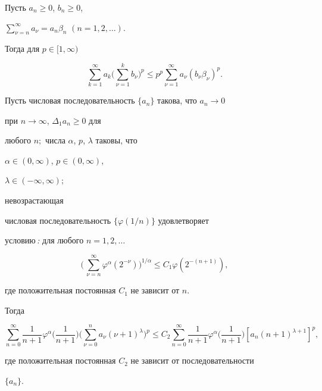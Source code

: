 \begin{lem} Пусть $a_n\ge 0$, $b_n\ge 0$,


$\sum\limits^\infty_{\nu=n}a_\nu=a_n\beta_n$ $(n=1,2,\dotsc)$.


Тогда для $p\in[1,\infty)$


$$


\sum^\infty_{k=1}a_k\biggl(\sum^k_{\nu=1}b_\nu\biggr)^p\le


p^p\sum^\infty_{\nu=1}a_\nu(b_\nu\beta_\nu)^p.


$$


\end{lem}





\begin{lem}


Пусть числовая последовательность $\{a_n\}$ такова, что $a_n\to 0$


при $n\to\infty$, $\Delta_1a_n\ge 0$ для


любого $n;$ числа $\alpha$, $p$, $\lambda$ таковы, что


$\alpha\in(0,\infty)$, $p\in(0,\infty)$,


$\lambda\in(-\infty,\infty);$


невозрастающая


числовая последовательность $\{\varphi(1/n)\}$ удовлетворяет


условию\,{\em :} для любого $n=1,2,\dotsc$


\begin{equation}


\biggl(\,\sum^\infty_{\nu=n}\varphi^\alpha(2^{-\nu})


\biggr)^{1/\alpha}\le C_1\varphi(2^{-(n+1)}),


\end{equation}


где положительная постоянная $C_1$ не зависит от $n$.





Тогда


$$


\sum^\infty_{n=0}\frac{1}{n+1}\varphi^\alpha


\biggl(\frac{1}{n+1} \biggr)\biggl(\sum^n_{\nu=0}a_\nu(\nu+1)^\lambda


\biggr)^p\le C_2\sum^\infty_{n=0}\frac{1}{n+1}


\varphi^\alpha\biggl(\frac{1}{n+1} \biggr)


[a_n(n+1)^{\lambda+1}]^p,


$$


где положительная постоянная $C_2$ не зависит от последовательности


$\{a_n\}$.


\end{lem}





